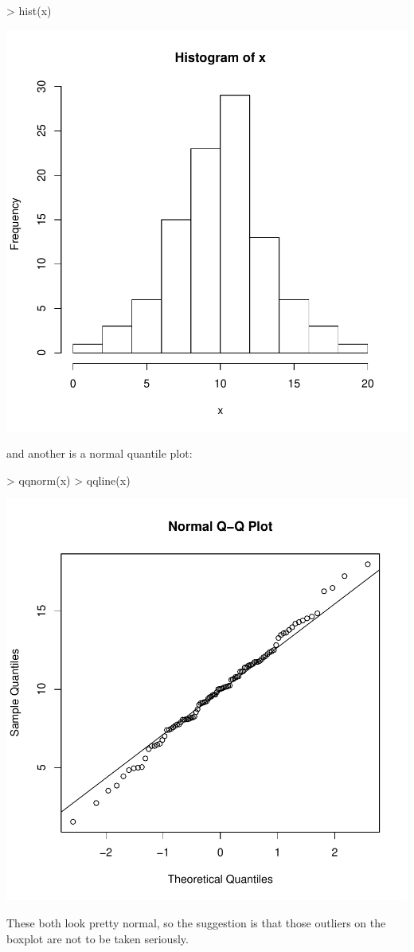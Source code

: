 \documentclass{article}
\begin{document}
\begin{Schunk}
\begin{Sinput}
> hist(x)
\end{Sinput}
\end{Schunk}
\includegraphics{test-003}

and another is a normal quantile plot:

\begin{Schunk}
\begin{Sinput}
> qqnorm(x)
> qqline(x)
\end{Sinput}
\end{Schunk}
\includegraphics{test-004}

These both look pretty normal, so the suggestion is that those outliers on the boxplot are not to be taken seriously.
\end{document}
